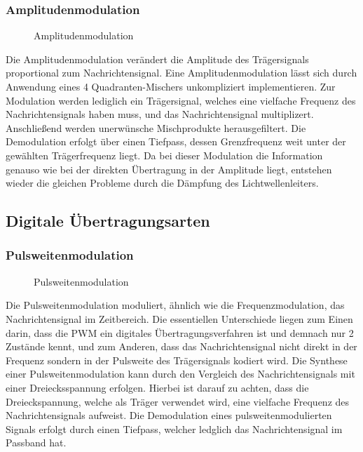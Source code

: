\subsubsection{Amplitudenmodulation}
\begin{figure}[H]
\centering
  \scalebox{0.7}{\begin{large}$$\end{large}}
  \caption{Amplitudenmodulation}
  \label{fig:am}
\end{figure}
Die Amplitudenmodulation verändert die Amplitude des Trägersignals proportional zum Nachrichtensignal.
Eine Amplitudenmodulation lässt sich durch Anwendung eines 4 Quadranten-Mischers unkompliziert implementieren. Zur Modulation werden lediglich ein Trägersignal, welches eine vielfache Frequenz des Nachrichtensignals haben muss, und das Nachrichtensignal multiplizert. Anschließend werden unerwünsche Mischprodukte herausgefiltert. Die Demodulation erfolgt über einen Tiefpass, dessen Grenzfrequenz weit unter der gewählten Trägerfrequenz liegt.
Da bei dieser Modulation die Information genauso wie bei der direkten Übertragung in der Amplitude liegt, entstehen wieder die gleichen Probleme durch die Dämpfung des Lichtwellenleiters.

\subsection{Digitale Übertragungsarten}
\subsubsection{Pulsweitenmodulation}
\begin{figure}[H]
\centering
  \scalebox{0.7}{\begin{large}
  $$
  \end{large}}
  \caption{Pulsweitenmodulation}
  \label{fig:pwm}
\end{figure}
Die Pulsweitenmodulation moduliert, ähnlich wie die Frequenzmodulation, das Nachrichtensignal im Zeitbereich. 
Die essentiellen Unterschiede liegen zum Einen darin, dass die PWM ein digitales Übertragungsverfahren ist und demnach nur 2 Zustände kennt, und zum Anderen, dass das Nachrichtensignal nicht direkt in der Frequenz sondern in der Pulsweite des Trägersignals kodiert wird. Die Synthese einer Pulsweitenmodulation kann durch den Vergleich des Nachrichtensignals mit einer Dreiecksspannung erfolgen. Hierbei ist darauf zu achten, dass die Dreieckspannung, welche als Träger verwendet wird, eine vielfache Frequenz des Nachrichtensignals aufweist. Die Demodulation eines pulsweitenmodulierten Signals erfolgt durch einen Tiefpass, welcher ledglich das Nachrichtensignal im Passband hat. 




